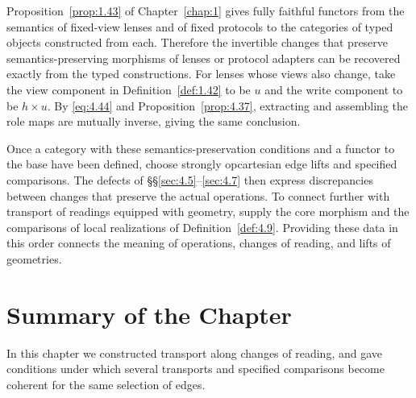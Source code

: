 Proposition~\ref{prop:1.43} of Chapter~\ref{chap:1} gives fully faithful functors from
the semantics of fixed-view lenses and of fixed protocols to the categories of typed
objects constructed from each.
Therefore the invertible changes that preserve semantics-preserving morphisms of
lenses or protocol adapters can be recovered exactly from the typed constructions.
For lenses whose views also change, take the view component in
Definition~\ref{def:1.42} to be $u$ and the write component to be $h\times u$.
By \eqref{eq:4.44} and Proposition~\ref{prop:4.37}, extracting and assembling
the role maps are mutually inverse, giving the same conclusion.

Once a category with these semantics-preservation conditions and a functor to the
base have been defined, choose strongly opcartesian edge lifts and specified comparisons.
The defects of \S\S\ref{sec:4.5}--\ref{sec:4.7} then express discrepancies
between changes that preserve the actual operations.
To connect further with transport of readings equipped with geometry, supply
the core morphism and the comparisons of local realizations of Definition~\ref{def:4.9}.
Providing these data in this order connects the meaning of operations, changes of
reading, and lifts of geometries.

\section*{Summary of the Chapter}

In this chapter we constructed transport along changes of reading, and gave conditions
under which several transports and specified comparisons become coherent for the same
selection of edges.

